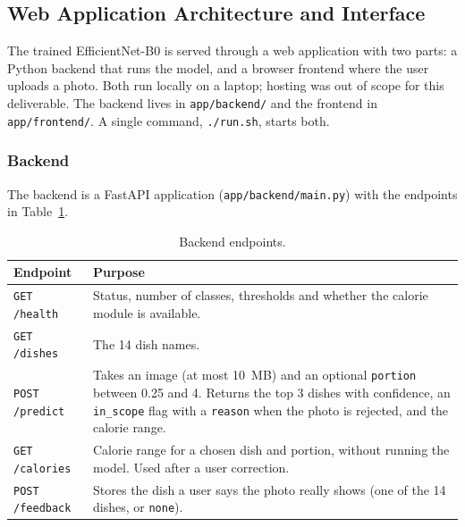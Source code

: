 \subsection{Web Application Architecture and Interface}

The trained EfficientNet-B0 is served through a web application with two parts:
a Python backend that runs the model, and a browser frontend where the user
uploads a photo. Both run locally on a laptop; hosting was out of scope for this
deliverable. The backend lives in \texttt{app/backend/} and the frontend in
\texttt{app/frontend/}. A single command, \texttt{./run.sh}, starts both.

\subsubsection{Backend}
The backend is a FastAPI application (\texttt{app/backend/main.py}) with the
endpoints in Table~\ref{tab:endpoints}.

\begin{table}[H]
  \centering
  \small
  \begin{tabular}{|l|p{10.2cm}|}
    \hline
    \textbf{Endpoint} & \textbf{Purpose} \\ \hline
    \texttt{GET /health} & Status, number of classes, thresholds and whether the
      calorie module is available. \\ \hline
    \texttt{GET /dishes} & The 14 dish names. \\ \hline
    \texttt{POST /predict} & Takes an image (at most 10~MB) and an optional
      \texttt{portion} between 0.25 and 4. Returns the top 3 dishes with
      confidence, an \texttt{in\_scope} flag with a \texttt{reason} when the photo
      is rejected, and the calorie range. \\ \hline
    \texttt{GET /calories} & Calorie range for a chosen dish and portion, without
      running the model. Used after a user correction. \\ \hline
    \texttt{POST /feedback} & Stores the dish a user says the photo really shows
      (one of the 14 dishes, or \texttt{none}). \\ \hline
  \end{tabular}
  \caption{Backend endpoints.}
  \label{tab:endpoints}
\end{table}

